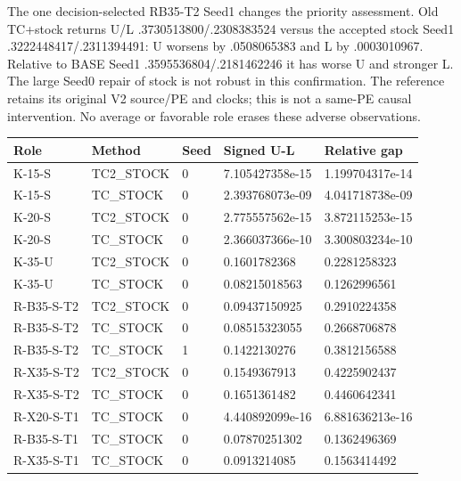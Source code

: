 \documentclass[
  american,
  11pt,
]{article}
\newcounter{none} %
\begin{document}
The one decision-selected RB35-T2 Seed1 changes the priority assessment.
Old TC+stock returns U/L .3730513800/.2308383524 versus the accepted
stock Seed1 .3222448417/.2311394491: U worsens by .0508065383 and L by
.0003010967. Relative to BASE Seed1 .3595536804/.2181462246 it has worse
U and stronger L. The large Seed0 repair of stock is not robust in this
confirmation. The reference retains its original V2 source/PE and
clocks; this is not a same-PE causal intervention. No average or
favorable role erases these adverse observations.


{\def\LTcaptype{none} %
\begin{longtable}[]{@{}lllll@{}}
\toprule\noalign{}
Role & Method & Seed & Signed U-L & Relative gap \\
\midrule\noalign{}
\endhead
\bottomrule\noalign{}
\endlastfoot
K-15-S & TC2\_\allowbreak{}STOCK & 0 & 7.105427358e-15 & 1.199704317e-14 \\
K-15-S & TC\_\allowbreak{}STOCK & 0 & 2.393768073e-09 & 4.041718738e-09 \\
K-20-S & TC2\_\allowbreak{}STOCK & 0 & 2.775557562e-15 & 3.872115253e-15 \\
K-20-S & TC\_\allowbreak{}STOCK & 0 & 2.366037366e-10 & 3.300803234e-10 \\
K-35-U & TC2\_\allowbreak{}STOCK & 0 & 0.1601782368 & 0.2281258323 \\
K-35-U & TC\_\allowbreak{}STOCK & 0 & 0.08215018563 & 0.1262996561 \\
R-B35-S-T2 & TC2\_\allowbreak{}STOCK & 0 & 0.09437150925 & 0.2910224358 \\
R-B35-S-T2 & TC\_\allowbreak{}STOCK & 0 & 0.08515323055 & 0.2668706878 \\
R-B35-S-T2 & TC\_\allowbreak{}STOCK & 1 & 0.1422130276 & 0.3812156588 \\
R-X35-S-T2 & TC2\_\allowbreak{}STOCK & 0 & 0.1549367913 & 0.4225902437 \\
R-X35-S-T2 & TC\_\allowbreak{}STOCK & 0 & 0.1651361482 & 0.4460642341 \\
R-X20-S-T1 & TC\_\allowbreak{}STOCK & 0 & 4.440892099e-16 & 6.881636213e-16 \\
R-B35-S-T1 & TC\_\allowbreak{}STOCK & 0 & 0.07870251302 & 0.1362496369 \\
R-X35-S-T1 & TC\_\allowbreak{}STOCK & 0 & 0.0913214085 & 0.1563414492 \\
\end{longtable}
}
\end{document}
